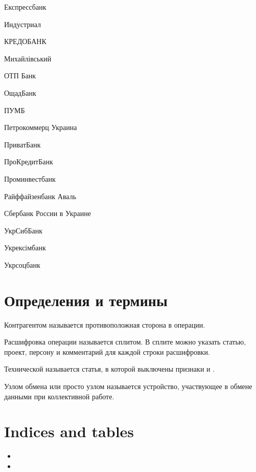 \documentclass[a4paper,10pt,russian]{sphinxmanual}
\begin{document}
\sphinxAtStartPar
Експресс\sphinxhyphen{}банк

\sphinxAtStartPar
Индустриал

\sphinxAtStartPar
КРЕДОБАНК

\sphinxAtStartPar
Михайлівський

\sphinxAtStartPar
ОТП Банк

\sphinxAtStartPar
ОщадБанк

\sphinxAtStartPar
ПУМБ

\sphinxAtStartPar
Петрокоммерц Украина

\sphinxAtStartPar
ПриватБанк

\sphinxAtStartPar
ПроКредитБанк

\sphinxAtStartPar
Проминвестбанк

\sphinxAtStartPar
Райффайзенбанк Аваль

\sphinxAtStartPar
Сбербанк России в Украине

\sphinxAtStartPar
УкрСибБанк

\sphinxAtStartPar
Укрексімбанк

\sphinxAtStartPar
Укрсоцбанк

\sphinxstepscope


\chapter{Определения и термины}
\label{\detokenize{glossary:chapter-index}}\label{\detokenize{glossary:id1}}\label{\detokenize{glossary::doc}}\begin{description}
\sphinxAtStartPar
Контрагентом называется противоположная сторона в операции.

\sphinxAtStartPar
Расшифровка операции называется сплитом. В сплите можно указать статью, проект, персону и комментарий
для каждой строки расшифровки.

\sphinxAtStartPar
Технической называется статья, в которой выключены признаки  и .

\sphinxAtStartPar
Узлом обмена или просто узлом называется устройство, участвующее в обмене данными при коллективной работе.

\end{description}


\chapter{Indices and tables}
\label{\detokenize{index:indices-and-tables}}\begin{itemize}
\item {} 
\sphinxAtStartPar
{}

\item {} 
\sphinxAtStartPar
{}

\end{itemize}



\renewcommand{\indexname}{Алфавитный указатель}
\printindex
\end{document}
